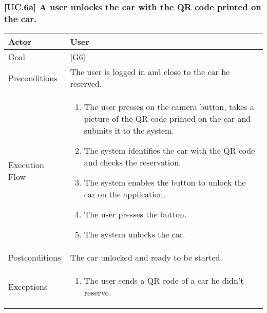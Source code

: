 \documentclass[english]{article}
\begin{document}
	\subsubsection{[UC.6a] A user unlocks the car with the QR code printed on the car.}
	\begin{tabularx}{\textwidth}{  l  X  }
		\hline
		Actor & User\\
		\hline
		Goal & [G6]\\
		\hline
		Preconditions & The user is logged in and close to the car he reserved.\\
		\hline
		Execution Flow & \begin{enumerate}
			\item{The user presses on the camera button, takes a picture of the QR code printed on the car and submits it to the system.}
			\item{The system identifies the car with the QR code and checks the reservation.}
			\item{The system enables the button to unlock the car on the application.}
			\item{The user presses the button.}
			\item{The system unlocks the car.}
		\end{enumerate}\\
		\hline
		Postconditions & The car unlocked and ready to be started.\\
		\hline
		Exceptions & \begin{enumerate}
			\item{The user sends a QR code of a car he didn't reserve.}
		\end{enumerate}\\
		\hline
	\end{tabularx}
	
\end{document}
